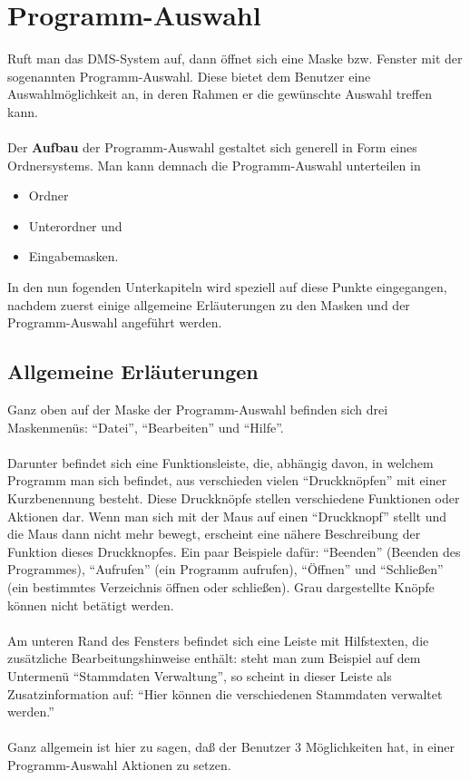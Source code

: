 \cleardoublepage

\section{Programm-Auswahl} 

Ruft man das DMS-System auf, dann \"{o}ffnet
sich eine Maske bzw. Fenster mit der sogenannten Programm-Auswahl.
Diese bietet dem Benutzer eine Auswahlm\"{o}glichkeit an, in deren Rahmen er
die gew\"{u}nschte Auswahl treffen kann. \\
\\
Der {\bf Aufbau} der Programm-Auswahl gestaltet sich generell in Form eines
Ordnersystems. Man kann demnach die Programm-Auswahl unterteilen in 

\begin{itemize}
\item Ordner
\item Unterordner und
\item Eingabemasken.
\end{itemize}

In  den nun fogenden Unterkapiteln  wird speziell auf diese Punkte
eingegangen, nachdem zuerst einige allgemeine Erl\"{a}uterungen zu den Masken
und der Programm-Auswahl angef\"{u}hrt werden.

\subsection{Allgemeine Erl\"{a}uterungen}

Ganz oben auf der Maske der Programm-Auswahl befinden sich drei
Maskenmen\"{u}s:
``Datei'', ``Bearbeiten'' und ``Hilfe''.\\
\\
Darunter befindet sich eine Funktionsleiste, die, abh\"{a}ngig davon, in
welchem Programm man sich befindet, aus verschieden vielen ``Druckkn\"{o}pfen'' mit
einer Kurzbenennung besteht. Diese Druckkn\"{o}pfe stellen verschiedene
Funktionen oder Aktionen dar. Wenn man sich mit der Maus auf einen
``Druckknopf'' stellt und die Maus dann nicht mehr bewegt, erscheint eine
n\"{a}here Beschreibung der Funktion dieses Druckknopfes. Ein paar Beispiele
daf\"{u}r: ``Beenden'' (Beenden des Programmes), ``Aufrufen'' (ein Programm
aufrufen), ``\"{O}ffnen'' und ``Schlie{\ss}en'' (ein bestimmtes Verzeichnis
\"{o}ffnen oder schlie{\ss}en). Grau dargestellte Kn\"{o}pfe k\"{o}nnen nicht
bet\"{a}tigt werden.\\
\\
Am unteren Rand des Fensters befindet sich eine Leiste mit Hilfstexten, die
zus\"{a}tzliche Bearbeitungshinweise enth\"{a}lt: steht man zum
Beispiel auf dem Untermen\"{u} ``Stammdaten Verwaltung'', so scheint in dieser
Leiste als Zusatzinformation auf: ``Hier k\"{o}nnen die verschiedenen
Stammdaten verwaltet werden.''\\
\\
Ganz allgemein ist hier zu sagen, da{\ss} der Benutzer 3 M\"{o}glichkeiten hat,
in einer Programm-Auswahl Aktionen zu setzen.

